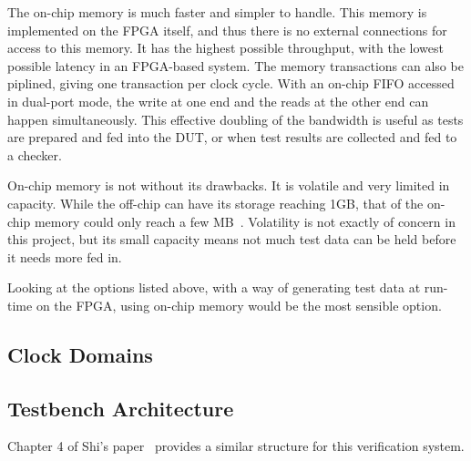The on-chip memory is much faster and simpler to handle.
This memory is implemented on the FPGA itself, and thus there is no external
connections for access to this memory.
It has the highest possible throughput, with the lowest possible latency
in an FPGA-based system.
The memory transactions can also be piplined, giving one transaction per
clock cycle.
With an on-chip FIFO accessed in dual-port mode, the write at one end and the
reads at the other end can happen simultaneously.
This effective doubling of the bandwidth is useful as tests are prepared
and fed into the DUT, or when test results are collected and fed to a checker.

On-chip memory is not without its drawbacks.
It is volatile and very limited in capacity.
While the off-chip can have its storage reaching 1GB, that of the on-chip
memory could only reach a few MB~\cite{Altera2}.
Volatility is not exactly of concern in this project, but its small capacity
means not much test data can be held before it needs more fed in.

Looking at the options listed above, with a way of generating test data at
run-time on the FPGA, using on-chip memory would be the most sensible option.


\subsection{Clock Domains}


\subsection{Testbench Architecture}


Chapter 4 of Shi's paper~\cite{Shi1} provides a similar structure for this
verification system.